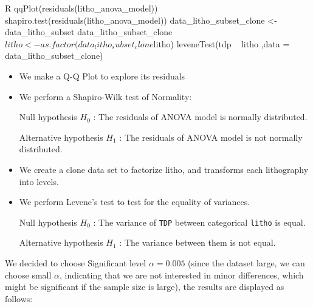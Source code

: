 \begin{code}{R}
    qqPlot(residuals(litho_anova_model))
    shapiro.test(residuals(litho_anova_model))
    data_litho_subset_clone <- data_litho_subset
    data_litho_subset_clone$litho <- as.factor(data_litho_subset_clone$litho)
    leveneTest(tdp ~ litho ,data = data_litho_subset_clone)
\end{code}
\begin{itemize}
    \item We make a Q-Q Plot to explore its residuals

    \item We perform a Shapiro-Wilk test of Normality:
    
        \qquad Null hypothesis $H_0$ : The residuals of ANOVA model is normally distributed.

        \qquad Alternative hypothesis $H_1$ : The residuals of ANOVA model is not normally distributed.

    \item We create a clone data set to factorize litho, and transforms each lithography into levels.
    
    \item We perform Levene's test to test for the equality of variances.
    
        \qquad Null hypothesis $H_0$ : The variance of \verb|TDP| between categorical \verb|litho| is equal.

        \qquad Alternative hypothesis $H_1$ : The variance between them is not equal.
\end{itemize}
We decided to choose Significant level $\alpha = 0.005$ (since the dataset large, we can choose small $\alpha$, indicating that we are not 
interested in minor differences, which might be significant if the sample size is large), the results 
are displayed as follows:
